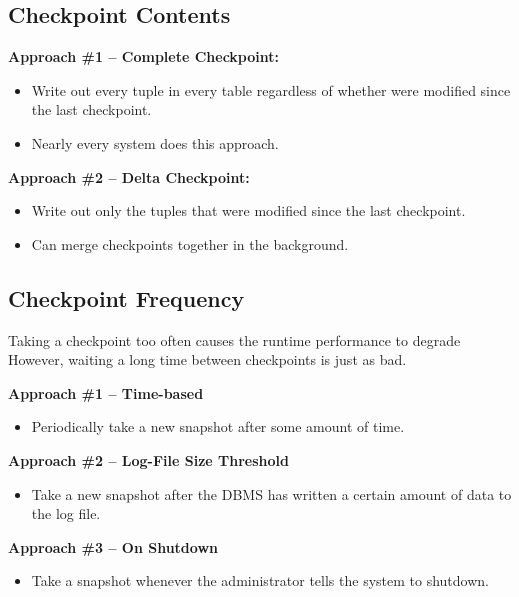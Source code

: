 \documentclass[11pt]{article}
\begin{document}
\subsection{Checkpoint Contents}

\textbf{Approach \#1 -- Complete Checkpoint:}
\begin{itemize}
    \item
    Write out every tuple in every table regardless of whether were modified since the 
    last checkpoint.

    \item
    Nearly every system does this approach.
\end{itemize}

\textbf{Approach \#2 -- Delta Checkpoint:}
\begin{itemize}
    \item
    Write out only the tuples that were modified since the last checkpoint.
    
    \item
    Can merge checkpoints together in the background.
\end{itemize}

\subsection{Checkpoint Frequency}
Taking a checkpoint too often causes the runtime performance to degrade
However, waiting a long time between checkpoints is just as bad.

\textbf{Approach \#1 -- Time-based}
\begin{itemize}
    \item
    Periodically take a new snapshot after some amount of time.
\end{itemize}

\textbf{Approach \#2 -- Log-File Size Threshold}
\begin{itemize}
    \item
    Take a new snapshot after the DBMS has written a certain amount of data to the log file.
\end{itemize}

\textbf{Approach \#3 -- On Shutdown}
\begin{itemize}
    \item Take a snapshot whenever the administrator tells the system to shutdown.
\end{itemize}
\end{document}
